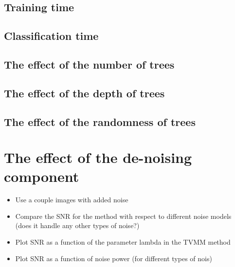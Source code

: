 \documentclass[12pt,twoside,notitlepage]{report}
\begin{document}
        \subsection{Training time}
        \subsection{Classification time}
        \subsection{The effect of the number of trees}
        \subsection{The effect of the depth of trees}
        \subsection{The effect of the randomness of trees}


    \section{The effect of the de-noising component}
        \begin{itemize}
            \item Use a couple images with added noise
            \item Compare the SNR for the method with respect to different noise models (does it handle any other types of noise?)
            \item Plot SNR as a function of the parameter lambda in the TVMM method
            \item Plot SNR as a function of noise power (for different types of nois)
        \end{itemize}


\end{document}
